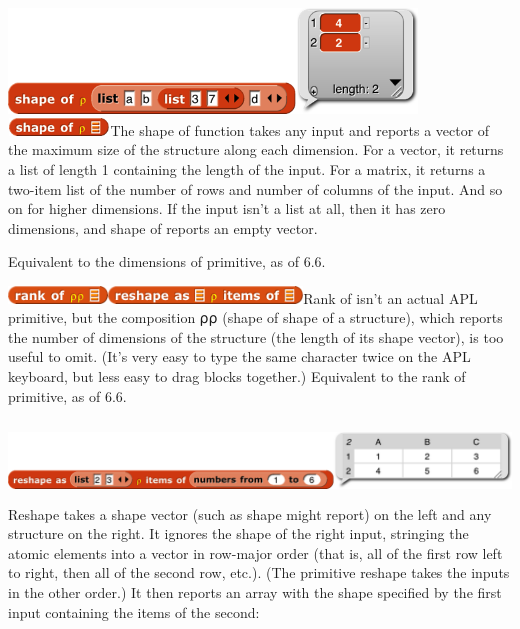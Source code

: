 \includegraphics[width=4.275in,height=1.1in]{media/image1267.png}\includegraphics[width=1.06667in,height=0.18333in]{media/image1268.png}The
shape of function takes any input and reports a vector of the maximum
size of the structure along each dimension. For a vector, it returns a
list of length 1 containing the length of the input. For a matrix, it
returns a two-item list of the number of rows and number of columns of
the input. And so on for higher dimensions. If the input isn't a list at
all, then it has zero dimensions, and shape of reports an empty vector.

Equivalent to the dimensions of primitive, as of 6.6.

\includegraphics[width=1.04167in,height=0.18333in]{media/image1269.png}\includegraphics[width=2.03333in,height=0.18333in]{media/image1270.png}Rank
of isn't an actual APL primitive, but the composition ⍴⍴ (shape of shape
of a structure), which reports the number of dimensions of the structure
(the length of its shape vector), is too useful to omit. (It's very easy
to type the same character twice on the APL keyboard, but less easy to
drag blocks together.) Equivalent to the rank of primitive, as of 6.6.

\includegraphics[width=7.325in,height=0.83333in]{media/image1271.png}Reshape
takes a shape vector (such as shape might report) on the left and any
structure on the right. It ignores the shape of the right input,
stringing the atomic elements into a vector in row-major order (that is,
all of the first row left to right, then all of the second row, etc.).
(The primitive reshape takes the inputs in the other order.) It then
reports an array with the shape specified by the first input containing
the items of the second:

